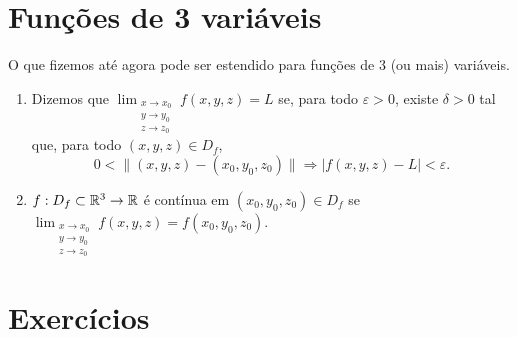 \section{Funções de 3 variáveis}

O que fizemos até agora pode ser estendido para funções de 3 (ou mais) variáveis.
\begin{enumerate}
    \item Dizemos que \(\displaystyle\lim_{\substack{x\to x_0 \\ y\to y_0 \\ z\to z_0}} f(x,y,z) = L\) se, para todo \(\varepsilon>0\), existe \(\delta>0\) tal que, para todo \((x,y,z)\in D_f\), \[0 < \|(x,y,z) - (x_0,y_0,z_0)\| \Rightarrow |f(x,y,z) - L| < \varepsilon.\]
    \item \(f:D_f\subset\mathbb{R}^3 \to \mathbb{R}\) é contínua em \((x_0,y_0,z_0)\in D_f\) se \(\displaystyle\lim_{\substack{x\to x_0 \\ y\to y_0 \\ z\to z_0}} f(x,y,z) = f(x_0,y_0,z_0)\).
\end{enumerate}

\section{Exercícios}

